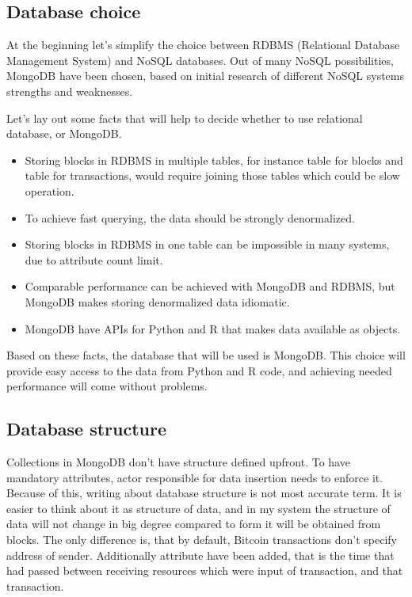 \documentclass[12pt, en, eng, oneside, final]{mgr}
\begin{document}
\subsection{Database choice}
At the beginning let's simplify the choice between RDBMS (Relational Database Management System) and NoSQL databases. Out of many NoSQL possibilities, MongoDB\cite{mongo} have been chosen, based on initial research of different NoSQL systems strengths and weaknesses.


Let's lay out some facts that will help to decide whether to use relational database, or MongoDB.

\begin{itemize}
\item 
Storing blocks in RDBMS in multiple tables, for instance table for blocks and table for transactions, would require joining those tables which could be slow operation.
\item 
To achieve fast querying, the data should be strongly denormalized.
\item
Storing blocks in RDBMS in one table can be impossible in many systems, due to attribute count limit.
\item 
Comparable performance can be achieved with MongoDB and RDBMS, but MongoDB makes storing denormalized data idiomatic.
\item
MongoDB have APIs for Python and R that makes data available as objects.
\end{itemize}

Based on these facts, the database that will be used is MongoDB. This choice will provide easy access to the data from Python and R code, and achieving needed performance will come without problems.


\subsection{Database structure}
 
Collections in MongoDB don't have structure defined upfront. To have mandatory attributes, actor responsible for data insertion needs to enforce it. Because of this, writing about database structure is not most accurate term. It is easier to think about it as structure of data, and in my system the structure of data will not change in big degree compared to form it will be obtained from blocks. The only difference is, that by default, Bitcoin transactions don't specify address of sender. Additionally attribute have been added, that is the time that had passed between receiving resources which were input of transaction, and that transaction.
\end{document}
